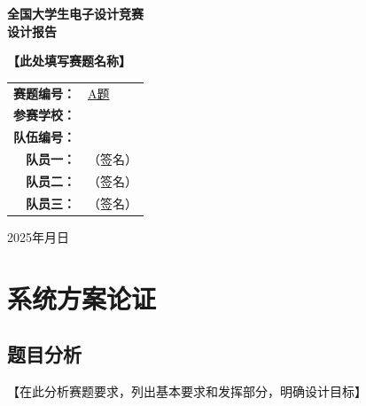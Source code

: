 \documentclass[12pt,a4paper]{ctexart}
\begin{document}
\begin{titlepage}
\centering
\vspace*{2cm}

{\Huge\bfseries 全国大学生电子设计竞赛\\[0.3cm]设计报告}

\vspace{2cm}

{\LARGE\bfseries 【此处填写赛题名称】}

\vspace{1.5cm}

\begin{tabular}{rl}
{\large\bfseries 赛题编号：} & {\large \underline{\hspace{3cm}A题\hspace{3cm}}} \\[0.8cm]
{\large\bfseries 参赛学校：} & {\large \underline{\hspace{5cm}}} \\[0.8cm]
{\large\bfseries 队伍编号：} & {\large \underline{\hspace{5cm}}} \\[0.8cm]
{\large\bfseries 队员一：} & {\large \underline{\hspace{4cm}}（签名）} \\[0.8cm]
{\large\bfseries 队员二：} & {\large \underline{\hspace{4cm}}（签名）} \\[0.8cm]
{\large\bfseries 队员三：} & {\large \underline{\hspace{4cm}}（签名）} \\
\end{tabular}

\vfill
{\large 2025年\hspace{1cm}月\hspace{1cm}日}
\end{titlepage}

\newpage
\tableofcontents
\newpage

\section{系统方案论证}

\subsection{题目分析}

【在此分析赛题要求，列出基本要求和发挥部分，明确设计目标】
\end{document}
